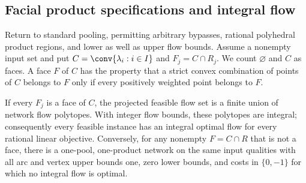 \subsection{Facial product specifications and integral flow}\label{s1:faces}

Return to standard pooling, permitting arbitrary bypasses, rational
polyhedral product regions, and lower as well as upper flow bounds.
Assume a nonempty input set and put
$C=\conv\{\lambda_i:i\in I\}$ and $F_j=C\cap R_j$.
We count $\varnothing$ and $C$ as faces. A face $F$ of $C$ has the
property that a strict convex combination of points of $C$ belongs to
$F$ only if every positively weighted point belongs to $F$.

\begin{theorem}\label{s1:facial}
If every $F_j$ is a face of $C$, the projected feasible flow set is a
finite union of network flow polytopes. With integer flow bounds, these
polytopes are integral; consequently every feasible instance has an
integral optimal flow for every rational linear objective.
Conversely, for any nonempty $F=C\cap R$ that is not a face, there is
a one-pool, one-product network on the same input qualities with all
arc and vertex upper bounds one, zero lower bounds, and costs in
$\{0,-1\}$ for which no integral flow is optimal.
\end{theorem}
